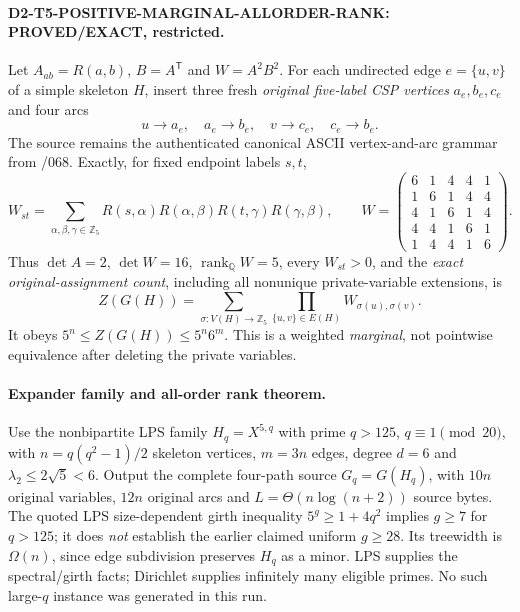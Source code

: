 \documentclass[11pt]{article}
\begin{document}
\paragraph{D2-T5-POSITIVE-MARGINAL-ALLORDER-RANK: PROVED/EXACT, restricted.}
Let $A_{ab}=R(a,b)$, $B=A^\mathsf T$ and
$W=A^2B^2$. For each undirected edge $e=\{u,v\}$ of
a simple skeleton $H$, insert three fresh \emph{original
five-label CSP vertices} $a_e,b_e,c_e$ and four arcs
\[
u\to a_e,\quad a_e\to b_e,\quad
v\to c_e,\quad c_e\to b_e.
\]
The source remains the authenticated canonical ASCII
vertex-and-arc grammar from /068. Exactly, for fixed
endpoint labels $s,t$,
\[
 W_{st}=\sum_{\alpha,\beta,\gamma\in\mathbb Z_5}
 R(s,\alpha)R(\alpha,\beta)R(t,\gamma)R(\gamma,\beta),
 \qquad
 W=\begin{pmatrix}
 6&1&4&4&1\\1&6&1&4&4\\4&1&6&1&4\\
 4&4&1&6&1\\1&4&4&1&6
 \end{pmatrix}.
\]
Thus $\det A=2$, $\det W=16$,
$\operatorname{rank}_{\mathbb Q}W=5$, every $W_{st}>0$,
and the \emph{exact original-assignment count}, including
all nonunique private-variable extensions, is
\[
 Z(G(H))=\sum_{\sigma:V(H)\to\mathbb Z_5}
       \prod_{\{u,v\}\in E(H)}W_{\sigma(u),\sigma(v)}.
\]
It obeys $5^n\le Z(G(H))\le5^n6^m$.
This is a weighted \emph{marginal}, not pointwise
equivalence after deleting the private variables.

\paragraph{Expander family and all-order rank theorem.}
Use the nonbipartite LPS family $H_q=X^{5,q}$ with
prime $q>125$, $q\equiv1\pmod{20}$, with
$n=q(q^2-1)/2$ skeleton vertices, $m=3n$ edges,
degree $d=6$ and $\lambda_2\le2\sqrt5<6$.
Output the complete four-path source $G_q=G(H_q)$,
with $10n$ original variables, $12n$ original arcs
and $L=\Theta(n\log(n+2))$ source bytes.
The quoted LPS size-dependent girth inequality
$5^g\ge1+4q^2$ implies $g\ge7$ for $q>125$;
it does \emph{not} establish the earlier claimed
uniform $g\ge28$. Its treewidth is
$\Omega(n)$, since edge subdivision preserves $H_q$
as a minor. LPS supplies the spectral/girth facts;
Dirichlet supplies infinitely many eligible primes.
No such large-$q$ instance was generated in this run.
\end{document}
